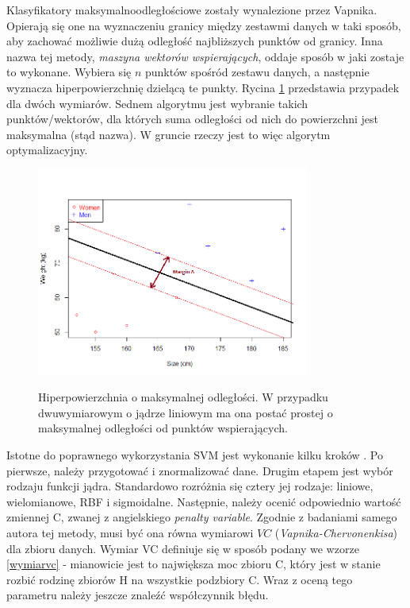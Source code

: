 \documentclass[12pt,a4paper,oneside]{report} %
\begin{document}
Klasyfikatory maksymalnoodległościowe zostały wynalezione przez Vapnika. Opierają się one na wyznaczeniu granicy między zestawmi danych w taki sposób, aby zachować możliwie dużą odległość najbliższych punktów od granicy. Inna nazwa tej metody, \emph{maszyna wektorów wspierających}, oddaje sposób w jaki zostaje to wykonane. Wybiera się $n$ punktów spośród zestawu danych, a następnie wyznacza hiperpowierzchnię dzielącą te punkty. Rycina \ref{hyperplanepng} przedstawia przypadek dla dwóch wymiarów. Sednem algorytmu jest wybranie takich punktów/wektorów, dla których suma odległości od nich do powierzchni jest maksymalna (stąd nazwa). W gruncie rzeczy jest to więc algorytm optymalizacyjny. \par

\begin{figure}
\centering
\includegraphics[width=0.8\textwidth]{hyperplane.png}
\label{hyperplanepng}
\caption[Hiperpowierzchnia o maksymalnej odległości]{Hiperpowierzchnia o maksymalnej odległości. W przypadku dwuwymiarowym o jądrze liniowym ma ona postać prostej o maksymalnej odległości od punktów wspierających.}
\end{figure}


Istotne do poprawnego wykorzystania SVM jest wykonanie kilku kroków \cite{chih-wei}. Po pierwsze, należy przygotować i znormalizować dane. Drugim etapem jest wybór rodzaju funkcji jądra. Standardowo rozróżnia się cztery jej rodzaje: liniowe, wielomianowe, RBF i sigmoidalne. Następnie, należy ocenić odpowiednio wartość zmiennej C, zwanej z angielskiego \emph{penalty variable}. Zgodnie z badaniami samego autora tej metody, musi być ona równa wymiarowi $VC$ (\emph{Vapnika-Chervonenkisa}) dla zbioru danych. Wymiar VC definiuje się w sposób podany we wzorze \ref{wymiarvc} - mianowicie jest to największa moc zbioru C, który jest w stanie rozbić rodzinę zbiorów H na wszystkie podzbiory C. Wraz z oceną tego parametru należy jeszcze znaleźć współczynnik błędu. \par
\end{document}
